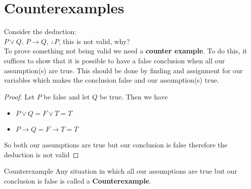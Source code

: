 \documentclass[../MATH-2000-Notes.tex]{subfiles}
\begin{document}
\section{Counterexamples}
Consider the deduction:\\
\(P\vee Q\), \(P\rightarrow Q\), \(\therefore P\), this is not valid, why?\\
To prove something not being valid we need a \textbf{counter example}. To do this, it suffices to show that it is possible to have a false conclusion when all our assumption(s) are true. This should be done by finding and assignment for our variables which makes the conclusion false and our assumption(s) true. 
\begin{proof}
    Let \(P\) be false and let \(Q\) be true. Then we have 
    \begin{itemize}
        \item \(P\vee Q = F \vee T  = T\)
        \item \(P\rightarrow Q = F \rightarrow T = T\)
    \end{itemize}
    So both our assumptions are true but our conclusion is false therefore the deduction is not valid
\end{proof}
\begin{Definition}
    {Counterexample}
    Any situation in which all our assumptions are true but our conclusion is false is called a \textbf{Counterexample}.
\end{Definition}
\end{document}
